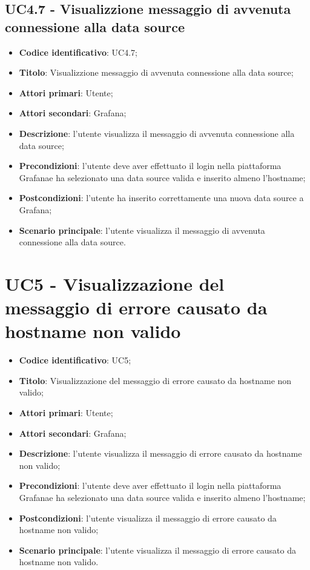     \subsection{UC4.7 - Visualizzione messaggio di avvenuta connessione alla data source}
        \begin{itemize}
            \item \textbf{Codice identificativo}: UC4.7;
            \item \textbf{Titolo}: Visualizzione messaggio di avvenuta connessione alla data source;
            \item \textbf{Attori primari}: Utente;
            \item \textbf{Attori secondari}: Grafana\glo;
            \item \textbf{Descrizione}: l'utente visualizza il messaggio di avvenuta connessione alla data source;
            \item \textbf{Precondizioni}: l'utente deve aver effettuato il login nella piattaforma Grafana\glo e ha selezionato una data                               source valida e inserito almeno l'hostname;
            \item \textbf{Postcondizioni}: l'utente ha inserito correttamente una nuova data source a Grafana\glo;
            \item \textbf{Scenario principale}: l'utente visualizza il messaggio di avvenuta connessione alla data source.
        \end{itemize}
\section{UC5 - Visualizzazione del messaggio di errore causato da hostname non valido}
\begin{itemize}
    \item \textbf{Codice identificativo}: UC5;
    \item \textbf{Titolo}: Visualizzazione del messaggio di errore causato da hostname non valido;
    \item \textbf{Attori primari}: Utente;
    \item \textbf{Attori secondari}: Grafana\glo;
    \item \textbf{Descrizione}: l'utente visualizza il messaggio di errore causato da hostname non valido;
    \item \textbf{Precondizioni}: l'utente deve aver effettuato il login nella piattaforma Grafana\glo e ha selezionato una data source                                valida e inserito almeno l'hostname;
    \item \textbf{Postcondizioni}: l'utente visualizza il messaggio di errore causato da hostname non valido;
    \item \textbf{Scenario principale}: l'utente visualizza il messaggio di errore causato da hostname non valido.
\end{itemize}
